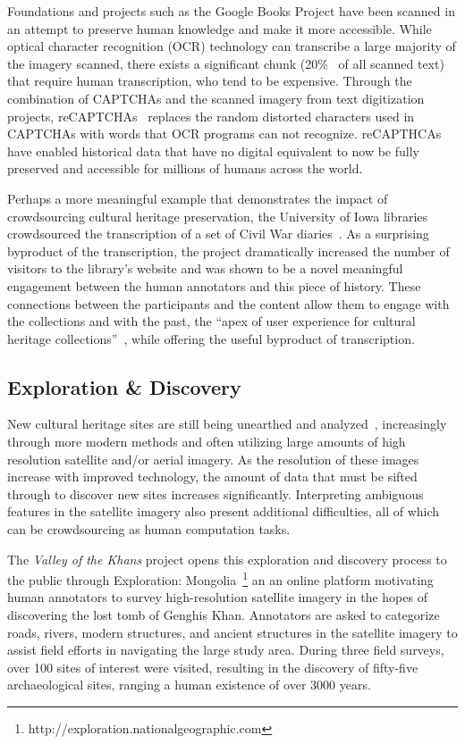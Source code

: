 \documentclass[10pt,twocolumn]{article}
\begin{document}
Foundations and projects such as the Google Books Project have been scanned 
in an attempt to preserve human knowledge and make it more accessible. While
optical character recognition (OCR) technology can transcribe a large majority
of the imagery scanned, there  exists a significant chunk 
(20\%~\cite{VonAhn2008a} of all scanned text) that require human transcription,
who tend to be expensive. Through the combination of CAPTCHAs and the scanned 
imagery from text digitization projects, reCAPTCHAs~\cite{VonAhn2008a} replaces 
the random distorted characters used in CAPTCHAs with words that OCR programs
can not recognize. reCAPTHCAs have enabled historical data that have no
digital equivalent to now be fully preserved and accessible for millions of
humans across the world.

Perhaps a more meaningful example that demonstrates the impact of 
crowdsourcing cultural heritage preservation, the University of Iowa 
libraries crowdsourced the transcription of a set of Civil War 
diaries~\cite{Owens2013}. As a surprising byproduct of the transcription, the
project dramatically increased the number of visitors to the library's
website and was shown to be a novel meaningful engagement between the human
annotators and this piece of history. These connections between the participants and the content allow them to engage with the collections and with the past, the ``apex of user experience for cultural heritage collections''~\cite{Owens2013}, while offering the useful byproduct of transcription.


\subsection{Exploration \& Discovery}
New cultural heritage sites are still being unearthed and 
analyzed~\cite{Lasaponara2007,Rowlands2007,Alexakis2009}, increasingly 
through more modern methods and often utilizing large amounts of
high resolution satellite and/or aerial imagery. As the resolution of
these images increase with improved technology, the amount of data that must
be sifted through to discover new sites increases significantly. Interpreting
ambiguous features in the satellite imagery also present additional 
difficulties, all of which can be crowdsourcing as human computation tasks.

The \textit{Valley of the Khans} project opens this exploration and discovery
process to the public through Exploration: 
Mongolia~\footnote{http://exploration.nationalgeographic.com} an
an online platform motivating human annotators to survey high-resolution
satellite imagery in the hopes of discovering the lost tomb of Genghis Khan.
Annotators are asked to categorize roads, rivers, modern structures, and
ancient structures in the satellite imagery to assist field efforts in
navigating the large study area. During three field surveys, over 100
sites of interest were visited, resulting in the discovery of fifty-five
archaeological sites, ranging a human existence of over 3000 years.
\end{document}
